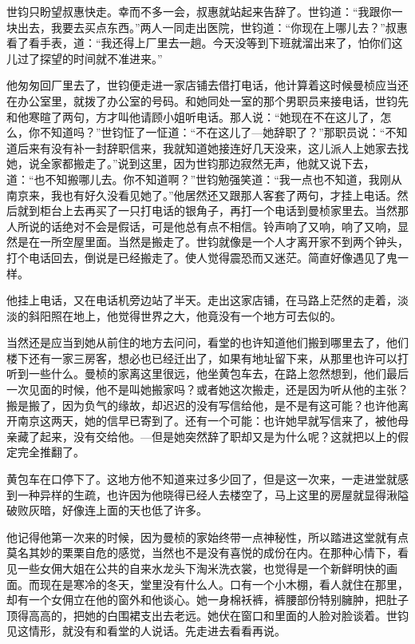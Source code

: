 \par 世钧只盼望叔惠快走。幸而不多一会，叔惠就站起来告辞了。世钧道：“我跟你一块出去，我要去买点东西。”两人一同走出医院，世钧道：“你现在上哪儿去？”叔惠看了看手表，道：“我还得上厂里去一趟。今天没等到下班就溜出来了，怕你们这儿过了探望的时间就不准进来。”
\par 他匆匆回厂里去了，世钧便走进一家店铺去借打电话，他计算着这时候曼桢应当还在办公室里，就拨了办公室的号码。和她同处一室的那个男职员来接电话，世钧先和他寒暄了两句，方才叫他请顾小姐听电话。那人说：“她现在不在这儿了，怎么，你不知道吗？”世钧怔了一怔道：“不在这儿了—她辞职了？”那职员说：“不知道后来有没有补一封辞职信来，我就知道她接连好几天没来，这儿派人上她家去找她，说全家都搬走了。”说到这里，因为世钧那边寂然无声，他就又说下去，道：“也不知搬哪儿去。你不知道啊？”世钧勉强笑道：“我一点也不知道，我刚从南京来，我也有好久没看见她了。”他居然还又跟那人客套了两句，才挂上电话。然后就到柜台上去再买了一只打电话的银角子，再打一个电话到曼桢家里去。当然那人所说的话绝对不会是假话，可是他总有点不相信。铃声响了又响，响了又响，显然是在一所空屋里面。当然是搬走了。世钧就像是一个人才离开家不到两个钟头，打个电话回去，倒说是已经搬走了。使人觉得震恐而又迷茫。简直好像遇见了鬼一样。
\par 他挂上电话，又在电话机旁边站了半天。走出这家店铺，在马路上茫然的走着，淡淡的斜阳照在地上，他觉得世界之大，他竟没有一个地方可去似的。
\par 当然还是应当到她从前住的地方去问问，看堂的也许知道他们搬到哪里去了，他们楼下还有一家三房客，想必也已经迁出了，如果有地址留下来，从那里也许可以打听到一些什么。曼桢的家离这里很远，他坐黄包车去，在路上忽然想到，他们最后一次见面的时候，他不是叫她搬家吗？或者她这次搬走，还是因为听从他的主张？搬是搬了，因为负气的缘故，却迟迟的没有写信给他，是不是有这可能？也许他离开南京这两天，她的信早已寄到了。还有一个可能：也许她早就写信来了，被他母亲藏了起来，没有交给他。—但是她突然辞了职却又是为什么呢？这就把以上的假定完全推翻了。
\par 黄包车在口停下了。这地方他不知道来过多少回了，但是这一次来，一走进堂就感到一种异样的生疏，也许因为他晓得已经人去楼空了，马上这里的房屋就显得湫隘破败灰暗，好像连上面的天也低了许多。
\par 他记得他第一次来的时候，因为曼桢的家始终带一点神秘性，所以踏进这堂就有点莫名其妙的栗栗自危的感觉，当然也不是没有喜悦的成份在内。在那种心情下，看见一些女佣大姐在公共的自来水龙头下淘米洗衣裳，也觉得是一个新鲜明快的画面。而现在是寒冷的冬天，堂里没有什么人。口有一个小木棚，看人就住在那里，却有一个女佣立在他的窗外和他谈心。她一身棉袄裤，裤腰部份特别臃肿，把肚子顶得高高的，把她的白围裙支出去老远。她伏在窗口和里面的人脸对脸谈着。世钧见这情形，就没有和看堂的人说话。先走进去看看再说。
